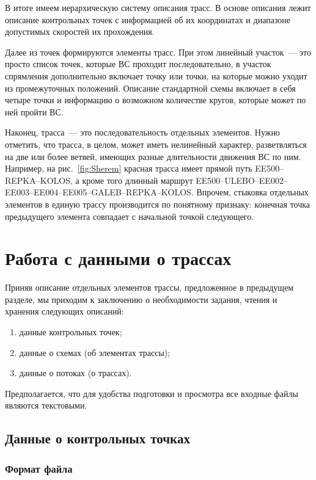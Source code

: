 \documentclass[12pt]{article}
\theoremstyle{plain}
\begin{document}
В итоге имеем иерархическую систему описания трасс. В основе описания лежит описание контрольных точек с информацией об их координатах и диапазоне допустимых скоростей их прохождения. 

Далее из точек формируются элементы трасс. При этом линейный участок~--- это просто список точек, которые ВС проходит последовательно, в участок спрямления дополнительно включает точку или точки, на которые можно уходит из промежуточных положений. Описание стандартной схемы включает в себя четыре точки и информацию о возможном количестве кругов, которые может по ней пройти ВС. 

Наконец, трасса~--- это последовательность отдельных элементов. Нужно отметить, что трасса, в целом, может иметь нелинейный характер, разветвляться на две или более ветвей, имеющих разные длительности движения ВС по ним. Например, на рис.~\ref{fig:Sherem} красная трасса имеет прямой путь EE500--REPKA--KOLOS, а кроме того длинный маршрут EE500--ULEBO--EE002--EE003--EE004--EE005--GALEB--REPKA--KOLOS. Впрочем, стыковка отдельных элементов в единую трассу производится по понятному признаку: конечная точка предыдущего элемента совпадает с начальной точкой следующего. 



\section{Работа с данными о трассах}

Приняв описание отдельных элементов трассы, предложенное в предыдущем разделе, мы приходим к заключению о необходимости задания, чтения и хранения следующих описаний:
\begin{enumerate}
  \item данные контрольных точек;
  \item данные о схемах (об элементах трассы);
  \item данные о потоках (о трассах).
\end{enumerate}

Предполагается, что для удобства подготовки и просмотра все входные файлы являются текстовыми.


\subsection{Данные о контрольных точках}

\subsubsection{Формат файла}
\end{document}
